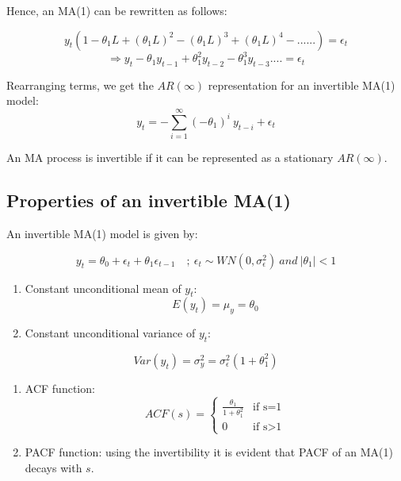 \documentclass[]{book}
\theoremstyle{definition}
\theoremstyle{definition}
\theoremstyle{definition}
\theoremstyle{remark}
\let\BeginKnitrBlock\begin \let\EndKnitrBlock\end
\begin{document}
Hence, an MA(1) can be rewritten as follows:

\[y_t (1-\theta_1 L+(\theta_1L)^2-(\theta_1L)^3+ (\theta_1L)^4-......)=\epsilon_t\]
\[\Rightarrow y_t -\theta_1 y_{t-1} +\theta_1^2y_{t-2}-\theta_1^3 y_{t-3}....=\epsilon_t\]

Rearranging terms, we get the \(AR(\infty)\) representation for an invertible MA(1) model:
\[y_t=-\sum_{i=1}^{\infty}(-\theta_1)^i \ y_{t-i}+\epsilon_t\]

\BeginKnitrBlock{definition}
\protect\hypertarget{def:unnamed-chunk-9}{}{\label{def:unnamed-chunk-9} }An MA process is invertible if it can be represented as a stationary \(AR(\infty)\).
\EndKnitrBlock{definition}

\hypertarget{properties-of-an-invertible-ma1}{%
\subsection{Properties of an invertible MA(1)}\label{properties-of-an-invertible-ma1}}

An invertible MA(1) model is given by:

\[ y_t = \theta_0 + \epsilon_t + \theta_1 \epsilon_{t-1} \quad ; \ \epsilon_t\sim WN(0, \sigma_\epsilon^2) \ and \  |\theta_1|<1\]

\begin{enumerate}
\def\labelenumi{\arabic{enumi}.}
\item
  Constant unconditional mean of \(y_t\):
  \[E(y_t)=\mu_y =\theta_0 \]
\item
  Constant unconditional variance of \(y_t\):
\end{enumerate}

\[Var(y_t)=\sigma^2_y=\sigma^2_\epsilon(1+\theta_1^2)\]

\begin{enumerate}
\def\labelenumi{\arabic{enumi}.}
\setcounter{enumi}{2}
\item
  ACF function:
  \begin{equation*}
    ACF(s) =
    \begin{cases}
   \frac{\theta_1}{1+\theta_1^2} & \text{if  s=1}\\
   0 & \text{if s>1}
    \end{cases}
   \end{equation*}
\item
  PACF function: using the invertibility it is evident that PACF of an MA(1) decays with \(s\).
\end{enumerate}
\end{document}
